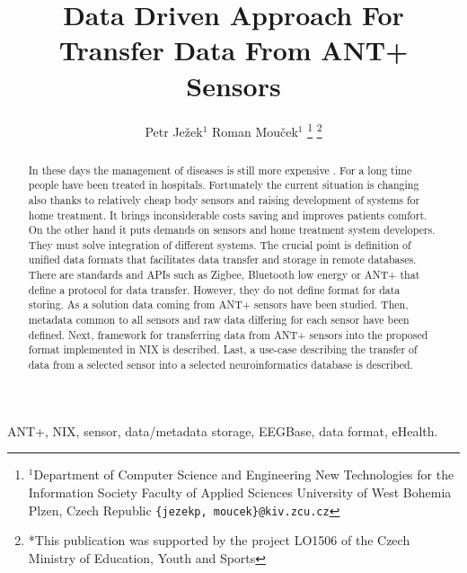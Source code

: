 \documentclass[conference]{IEEEtran}
\begin{document}
  \title{Data Driven Approach For Transfer Data  From ANT+ Sensors}

  \author{{Petr Je\v{z}ek$^{1}$ Roman Mou\v{c}ek$^{1}$}
\thanks{$^{1}$Department of Computer Science and Engineering
New Technologies for the Information Society
Faculty of Applied Sciences
University of West Bohemia
Plzen, Czech Republic
        {\tt\small \{jezekp, moucek\}@kiv.zcu.cz}}%
\thanks{*This publication was supported by the project LO1506 of the Czech Ministry of Education, Youth and Sports}%
}
\maketitle



\begin{abstract}
In these days the management of diseases is still more expensive . For a long time people have been treated in hospitals. Fortunately the current situation is changing also thanks to relatively cheap body sensors and raising development of systems for home treatment. It brings inconsiderable costs saving and improves patients comfort. On the other hand it puts demands on sensors and home treatment system developers. They must solve integration of different systems. The crucial point is definition of unified data formats that facilitates data transfer and storage in remote databases. There are standards and APIs such as Zigbee, Bluetooth low energy or ANT+ that define a protocol for data transfer. However, they do not define format for data storing. As a solution data coming from ANT+ sensors have been studied. Then, metadata common to all sensors and raw data differing for each sensor have been defined. Next, framework for transferring data from ANT+ sensors into the proposed format implemented in NIX is described. Last, a use-case describing the transfer of data from a selected sensor into a selected neuroinformatics database is described.



\end{abstract}

\begin{IEEEkeywords}
ANT+, NIX, sensor, data/metadata storage, EEGBase, data format, eHealth.
\end{IEEEkeywords}
\end{document}

